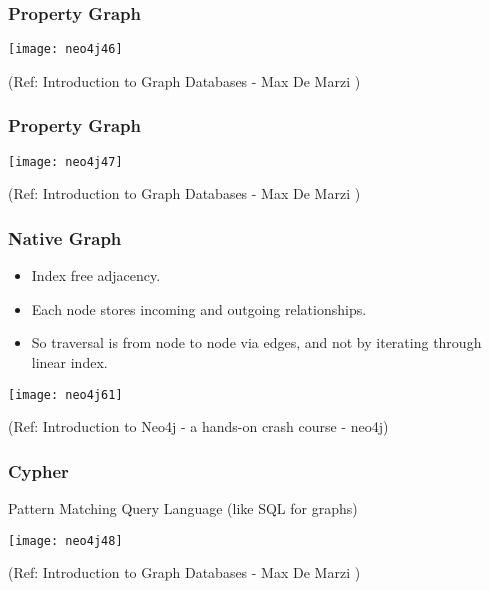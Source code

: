 \begin{frame}\frametitle{Property Graph}

\begin{center}
\texttt{[image: neo4j46]}
\end{center}	

{\tiny (Ref: Introduction to Graph Databases - Max De Marzi )}
\end{frame}

\begin{frame}\frametitle{Property Graph}

\begin{center}
\texttt{[image: neo4j47]}
\end{center}	

{\tiny (Ref: Introduction to Graph Databases - Max De Marzi )}
\end{frame}

\begin{frame}\frametitle{Native Graph}

\begin{itemize}
\item Index free adjacency.
\item Each node stores incoming and outgoing relationships.
\item So traversal is from node to node via edges, and not by iterating through linear index.
\end{itemize}

\begin{center}
\texttt{[image: neo4j61]}
\end{center}	

{\tiny (Ref: Introduction to Neo4j - a hands-on crash course - neo4j)}
\end{frame}


\begin{frame}\frametitle{Cypher}

Pattern Matching Query Language (like SQL for graphs)

\begin{center}
\texttt{[image: neo4j48]}
\end{center}	

{\tiny (Ref: Introduction to Graph Databases - Max De Marzi )}
\end{frame}


